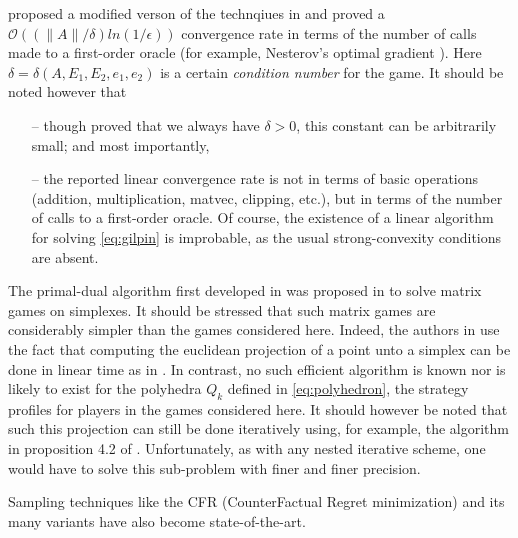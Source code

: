 \documentclass[envcountsame]{llncs} %
\begin{document}
\cite{gilpinfirst} proposed a modified verson of the technqiues in
\cite{hoda2010smoothing} and  proved a $\mathcal{O}\left(\left(\|A\| /
\delta\right) ln\left(1 / \epsilon\right)\right)$ convergence rate in
terms of the number of calls made to a first-order oracle (for
example, Nesterov's optimal gradient \cite{nesterov1983}). Here
$\delta = \delta(A, E_1, E_2, e_1, e_2)$ is a certain
\textit{condition number} for the game. It should be noted however that
\begin{itemize}
\item[--] though \cite{gilpinfirst} proved that we always have $\delta
  > 0$, this constant can be arbitrarily small; and most importantly,
\item[--] the reported linear convergence rate is not in terms of
  basic operations (addition, multiplication, matvec, clipping, etc.),
  but in terms of the number of calls to a first-order oracle. Of
  course, the existence of a linear algorithm for solving
  \eqref{eq:gilpin} is improbable, as the usual strong-convexity
  conditions are absent.

\end{itemize}



The primal-dual algorithm first developed in \cite{chambolle2010} was
proposed \cite{chambolle2014ergodic} in to solve matrix games on
simplexes. It should be stressed that such matrix games are
considerably simpler than the games considered here. Indeed, the
authors in \cite{chambolle2014ergodic} use the fact that computing the
euclidean projection of a point unto a simplex can be done in linear
time as in \cite{duchi2008efficient}. In contrast, no such efficient
algorithm is known nor is likely to exist for the polyhedra $Q_k$
defined in \eqref{eq:polyhedron}, the strategy profiles for players in
the games considered here. It should however be noted that such this
projection can still be done iteratively using, for example, the
algorithm in proposition 4.2 of \cite{combettes2010dualization}%
. Unfortunately, as
with any nested iterative scheme, one would have to solve this
sub-problem with finer and finer precision.


Sampling techniques like the CFR (CounterFactual Regret minimization)
and its many variants
\cite{MartinZinkevichNIPS2007,lanctot2009monte,Bowling09012015} have
also become state-of-the-art.
\end{document}
